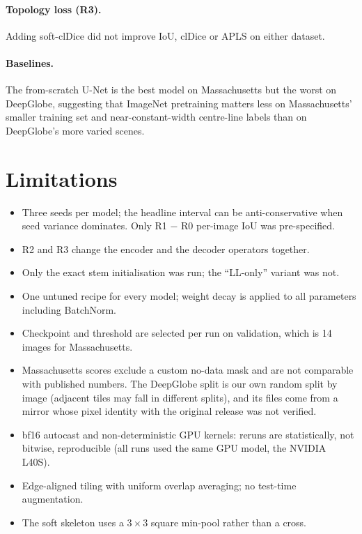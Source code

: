\documentclass[11pt]{article}
\begin{document}
\paragraph{Topology loss (R3).} Adding soft-clDice did not improve IoU, clDice or APLS on either
dataset.

\paragraph{Baselines.} The from-scratch U-Net is the best model on Massachusetts but the worst on
DeepGlobe, suggesting that ImageNet pretraining matters less on Massachusetts' smaller training
set and near-constant-width centre-line labels than on DeepGlobe's more varied scenes.

\section{Limitations}

\begin{itemize}
  \item Three seeds per model; the headline interval can be anti-conservative when seed variance
        dominates. Only R1 $-$ R0 per-image IoU was pre-specified.
  \item R2 and R3 change the encoder and the decoder operators together.
  \item Only the exact stem initialisation was run; the ``LL-only'' variant was not.
  \item One untuned recipe for every model; weight decay is applied to all parameters including
        BatchNorm.
  \item Checkpoint and threshold are selected per run on validation, which is 14 images for
        Massachusetts.
  \item Massachusetts scores exclude a custom no-data mask and are not comparable with published
        numbers. The DeepGlobe split is our own random split by image (adjacent tiles may fall in
        different splits), and its files come from a mirror whose pixel identity with the original
        release was not verified.
  \item bf16 autocast and non-deterministic GPU kernels: reruns are statistically, not bitwise,
        reproducible (all runs used the same GPU model, the NVIDIA L40S).
  \item Edge-aligned tiling with uniform overlap averaging; no test-time augmentation.
  \item The soft skeleton uses a $3\times3$ square min-pool rather than a cross.
\end{itemize}
\end{document}
